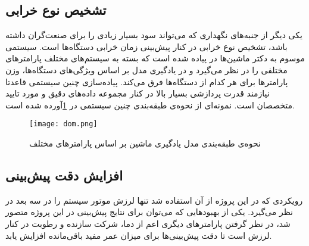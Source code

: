 \subsection{تشخیص نوع خرابی}
یکی دیگر از جنبه‌های نگهداری که می‌تواند سود بسیار زیادی را برای صنعت‌گران داشته باشد، تشخیص نوع خرابی در کنار پیش‌بینی زمان خرابی دستگاه‌ها است. سیستمی موسوم به دکتر ماشین‌ها در \cite{patel2020doctor} پیاده شده است که بسته به سیستم‌های مختلف پارامتر‌های مختلفی را در نظر می‌گیرد و در یادگیری مدل بر اساس ویژگی‌های دستگاه‌ها، وزن پارامتر‌ها برای هر کدام از دستگاه‌ها فرق می‌کند. پیاده‌سازی چنین سیستمی قاعدتا نیازمند قدرت پردازشی بسیار بالا در کنار مجموعه داده‌های دقیق و مورد تایید متخصصان است. نمونه‌ای از نحوه‌ی طبقه‌بندی چنین سیستمی در \cref{fig:dom}\cite{patel2020doctor}آورده شده است.

\begin{figure}[!h]
\centerline{\texttt{[image: dom.png]}}
\caption{نحوه‌ی طبقه‌بندی مدل یادگیری ماشین بر اساس پارامتر‌های مختلف\cite{patel2020doctor}}
\label{fig:dom}
\end{figure}


\subsection{افزایش دقت پیش‌بینی}
رویکردی که در این پروژه از آن استفاده شد تنها لرزش موتور سیستم را در سه بعد در نظر می‌گیرد. یکی از بهبودهایی که می‌توان برای نتایج پیش‌بینی در این پروژه متصور شد، در نظر گرفتن پارامترهای دیگری اعم از دما، شرکت سازنده و رطوبت در کنار لرزش است تا دقت پیش‌بینی‌ها برای میزان عمر مفید باقی‌مانده افزایش یابد. 

